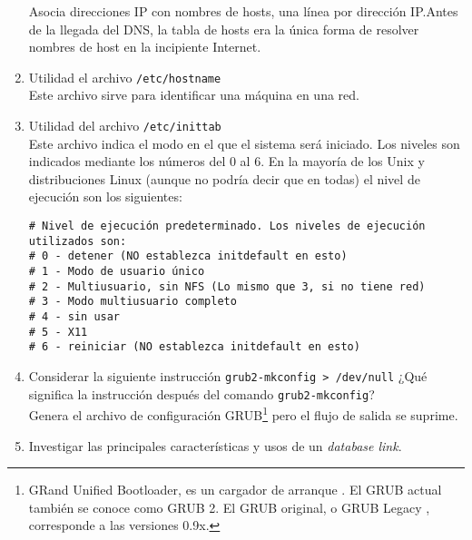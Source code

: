 \documentclass[../main.tex]{subfiles}
\begin{document}
\begin{enumerate}
        Asocia direcciones IP con nombres de hosts, una línea por dirección IP.\@ Antes de la
        llegada del DNS, la tabla de hosts era la única forma de resolver nombres de host
        en la incipiente Internet.\\

  \item Utilidad el archivo \texttt{/etc/hostname}\\

        Este archivo sirve para identificar una máquina en una red\cite{archwiki:domain}.\\

  \item Utilidad del archivo \texttt{/etc/inittab}\\

        Este archivo indica el modo en el que el sistema será iniciado. Los niveles son indicados
        mediante los números del 0 al 6. En la mayoría de los Unix y distribuciones Linux (aunque
        no podría decir que en todas) el nivel de ejecución son los siguientes:

        \begin{code}
          \begin{verbatim}
# Nivel de ejecución predeterminado. Los niveles de ejecución utilizados son:
# 0 - detener (NO establezca initdefault en esto)
# 1 - Modo de usuario único
# 2 - Multiusuario, sin NFS (Lo mismo que 3, si no tiene red)
# 3 - Modo multiusuario completo
# 4 - sin usar
# 5 - X11
# 6 - reiniciar (NO establezca initdefault en esto)

          \end{verbatim}
        \end{code}

  \item Considerar la siguiente instrucción \texttt{grub2-mkconfig > /dev/null}
        ¿Qué significa la instrucción después del comando \texttt{grub2-mkconfig}?\\

        Genera el archivo de configuración GRUB\footnote{GRand Unified Bootloader,  es
        un cargador de arranque . El GRUB actual también se conoce como GRUB 2. El GRUB original, o
        GRUB Legacy , corresponde a las versiones 0.9x.} pero el flujo de salida se suprime\cite{archwiki:grub}.\\

  \item Investigar las principales características y usos de un \textit{database link}.\\


\end{enumerate}
\end{document}
